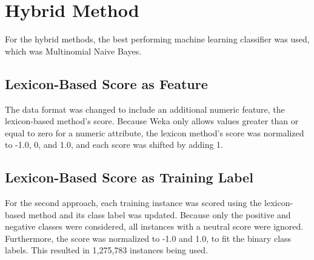 \section{Hybrid Method}
For the hybrid methods, the best performing machine learning classifier was used, which was Multinomial Naive Bayes.

\subsection{Lexicon-Based Score as Feature}
The data format was changed to include an additional numeric feature, the lexicon-based method's score. Because Weka only allows values greater than or equal to zero for a numeric attribute, the lexicon method's score was normalized to -1.0, 0, and 1.0, and each score was shifted by adding 1.

\subsection{Lexicon-Based Score as Training Label}
For the second approach, each training instance was scored using the lexicon-based method and its class label was updated. Because only the positive and negative classes were considered, all instances with a neutral score were ignored. Furthermore, the score was normalized to -1.0 and 1.0, to fit the binary class labels. This resulted in 1,275,783 instances being used.



